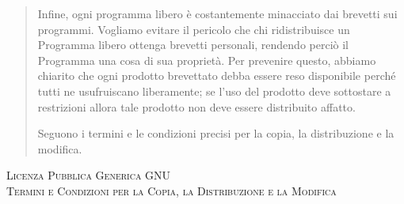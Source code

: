 \begin{quote}
  Infine, ogni programma libero \`e costantemente minacciato
  dai brevetti sui programmi. Vogliamo evitare il pericolo
  che chi ridistribuisce un Programma libero ottenga
  brevetti personali, rendendo perci\`o il Programma una
  cosa di sua propriet\`a. Per prevenire questo, abbiamo
  chiarito che ogni prodotto brevettato debba essere reso
  disponibile perch\'e tutti ne usufruiscano liberamente; se
  l'uso del prodotto deve sottostare a restrizioni allora
  tale prodotto non deve essere distribuito affatto.

  Seguono i termini e le condizioni precisi per la copia, la
  distribuzione e la modifica.
\end{quote}

\begin{center}
  \Large \scshape Licenza Pubblica Generica GNU \\
  \vspace{3mm} Termini e Condizioni per la Copia, la
  Distribuzione e la Modifica
\end{center}

